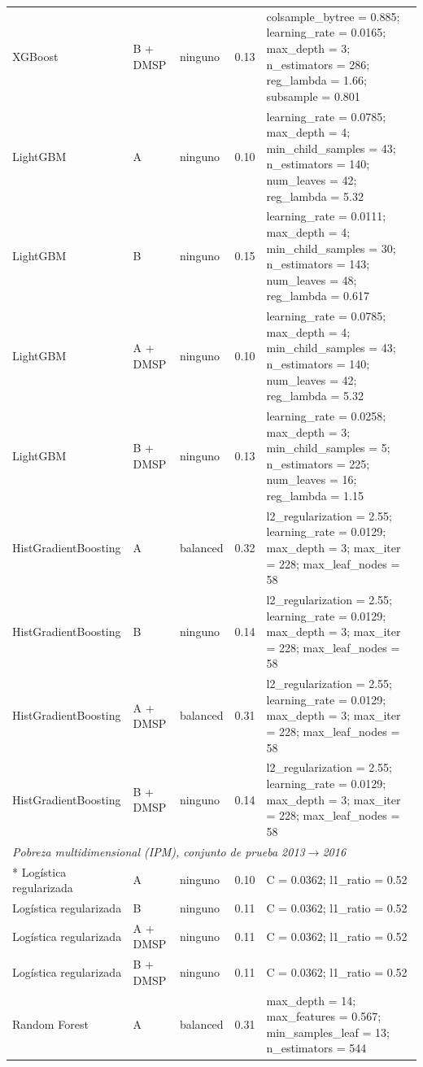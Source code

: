 {\begin{longtable}{lllc>{\raggedright\arraybackslash}p{}}
  XGBoost & B + DMSP & ninguno & 0.13 & colsample\_bytree = 0.885; learning\_rate = 0.0165; max\_depth = 3; n\_estimators = 286; reg\_lambda = 1.66; subsample = 0.801 \\
  LightGBM & A & ninguno & 0.10 & learning\_rate = 0.0785; max\_depth = 4; min\_child\_samples = 43; n\_estimators = 140; num\_leaves = 42; reg\_lambda = 5.32 \\
  LightGBM & B & ninguno & 0.15 & learning\_rate = 0.0111; max\_depth = 4; min\_child\_samples = 30; n\_estimators = 143; num\_leaves = 48; reg\_lambda = 0.617 \\
  LightGBM & A + DMSP & ninguno & 0.10 & learning\_rate = 0.0785; max\_depth = 4; min\_child\_samples = 43; n\_estimators = 140; num\_leaves = 42; reg\_lambda = 5.32 \\
  LightGBM & B + DMSP & ninguno & 0.13 & learning\_rate = 0.0258; max\_depth = 3; min\_child\_samples = 5; n\_estimators = 225; num\_leaves = 16; reg\_lambda = 1.15 \\
  HistGradientBoosting & A & balanced & 0.32 & l2\_regularization = 2.55; learning\_rate = 0.0129; max\_depth = 3; max\_iter = 228; max\_leaf\_nodes = 58 \\
  HistGradientBoosting & B & ninguno & 0.14 & l2\_regularization = 2.55; learning\_rate = 0.0129; max\_depth = 3; max\_iter = 228; max\_leaf\_nodes = 58 \\
  HistGradientBoosting & A + DMSP & balanced & 0.31 & l2\_regularization = 2.55; learning\_rate = 0.0129; max\_depth = 3; max\_iter = 228; max\_leaf\_nodes = 58 \\
  HistGradientBoosting & B + DMSP & ninguno & 0.14 & l2\_regularization = 2.55; learning\_rate = 0.0129; max\_depth = 3; max\_iter = 228; max\_leaf\_nodes = 58 \\
  \midrule
  \multicolumn{5}{l}{\textit{Pobreza multidimensional (IPM), conjunto de prueba 2013$\to$2016}} \\*
  Logística regularizada & A & ninguno & 0.10 & C = 0.0362; l1\_ratio = 0.52 \\
  Logística regularizada & B & ninguno & 0.11 & C = 0.0362; l1\_ratio = 0.52 \\
  Logística regularizada & A + DMSP & ninguno & 0.11 & C = 0.0362; l1\_ratio = 0.52 \\
  Logística regularizada & B + DMSP & ninguno & 0.11 & C = 0.0362; l1\_ratio = 0.52 \\
  Random Forest & A & balanced & 0.31 & max\_depth = 14; max\_features = 0.567; min\_samples\_leaf = 13; n\_estimators = 544 \\

\end{longtable}}

